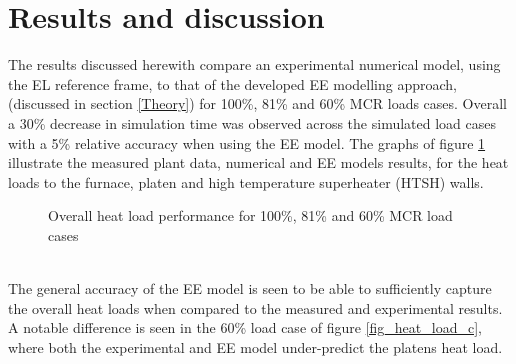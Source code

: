\documentclass{webofc}
\begin{document}
\section{Results and discussion} \label{Results}
The results discussed herewith compare an experimental numerical model, using the EL reference frame, to that of the developed EE modelling approach, (discussed in section \ref{Theory}) for 100\%, 81\% and 60\% MCR loads cases. Overall a 30\% decrease in simulation time was observed across the simulated load cases with a 5\% relative accuracy when using the EE model. The graphs of figure \ref{fig_heat_load} illustrate the measured plant data, numerical and EE models results,  for the heat loads to the furnace, platen and high temperature superheater (HTSH) walls. 
\begin{figure}[h!]
\centering
{}
\hspace{5mm}
\hspace{5mm}
\setlength{\belowcaptionskip}{0pt}
\caption{Overall heat load performance for 100\%, 81\% and 60\% MCR load cases}
\label{fig_heat_load}
\end{figure}\\
The general accuracy of the EE model is seen to be able to sufficiently capture the overall heat loads when compared to the measured and experimental results. A notable difference is seen in the 60\% load case of figure \ref{fig_heat_load_c}, where both the experimental and EE model under-predict the platens heat load.
\end{document}
